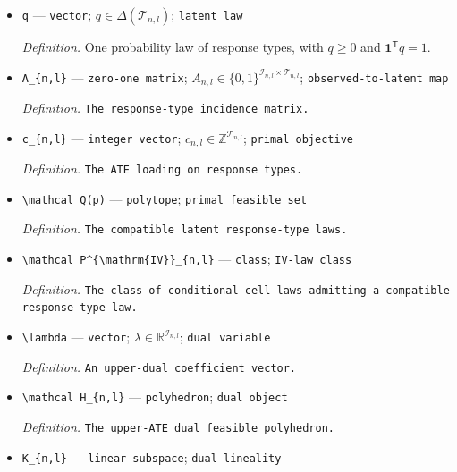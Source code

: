 \documentclass{article}
\begin{document}
\begin{itemize}
  \item \texttt{q} --- \texttt{vector}; \(q\in\Delta(\mathcal T_{n,l})\); \texttt{latent law}
  \par\smallskip\noindent\emph{Definition.} One probability law of response types, with \(q\ge0\) and \(\mathbf 1^{\mathsf T}q=1\).
  \item \texttt{A\_\allowbreak{}\{n,\allowbreak{}l\}\allowbreak{}} --- \texttt{zero-\allowbreak{}one matrix}; \(A_{n,l}\in\{0,1\}^{\mathcal I_{n,l}\times\mathcal T_{n,l}}\); \texttt{observed-\allowbreak{}to-\allowbreak{}latent map}
  \par\smallskip\noindent\emph{Definition.} \texttt{The response-\allowbreak{}type incidence matrix.}
  \item \texttt{c\_\allowbreak{}\{n,\allowbreak{}l\}\allowbreak{}} --- \texttt{integer vector}; \(c_{n,l}\in\mathbb Z^{\mathcal T_{n,l}}\); \texttt{primal objective}
  \par\smallskip\noindent\emph{Definition.} \texttt{The ATE loading on response types.}
  \item \texttt{\textbackslash{}\allowbreak{}mathcal Q(p)} --- \texttt{polytope}; \texttt{primal feasible set}
  \par\smallskip\noindent\emph{Definition.} \texttt{The compatible latent response-\allowbreak{}type laws.}
  \item \texttt{\textbackslash{}\allowbreak{}mathcal P\textasciicircum{}\{\textbackslash{}\allowbreak{}mathrm\{IV\}\allowbreak{}\}\allowbreak{}\_\allowbreak{}\{n,\allowbreak{}l\}\allowbreak{}} --- \texttt{class}; \texttt{IV-\allowbreak{}law class}
  \par\smallskip\noindent\emph{Definition.} \texttt{The class of conditional cell laws admitting a compatible response-\allowbreak{}type law.}
  \item \texttt{\textbackslash{}\allowbreak{}lambda} --- \texttt{vector}; \(\lambda\in\mathbb R^{\mathcal I_{n,l}}\); \texttt{dual variable}
  \par\smallskip\noindent\emph{Definition.} \texttt{An upper-\allowbreak{}dual coefficient vector.}
  \item \texttt{\textbackslash{}\allowbreak{}mathcal H\_\allowbreak{}\{n,\allowbreak{}l\}\allowbreak{}} --- \texttt{polyhedron}; \texttt{dual object}
  \par\smallskip\noindent\emph{Definition.} \texttt{The upper-\allowbreak{}ATE dual feasible polyhedron.}
  \item \texttt{K\_\allowbreak{}\{n,\allowbreak{}l\}\allowbreak{}} --- \texttt{linear subspace}; \texttt{dual lineality}

\end{itemize}
\end{document}
